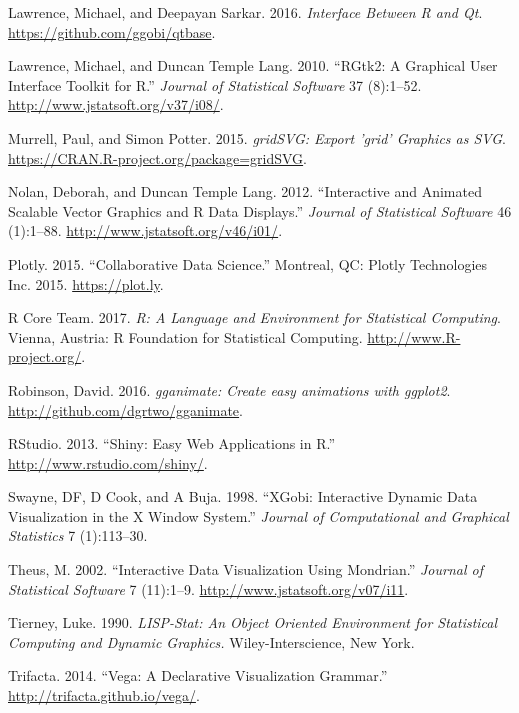 \documentclass[12pt,]{article}
\theoremstyle{definition}
\theoremstyle{definition}
\theoremstyle{definition}
\theoremstyle{remark}
\begin{document}
\leavevmode\hypertarget{ref-qtbase}{}%
Lawrence, Michael, and Deepayan Sarkar. 2016. \emph{Interface Between R
and Qt}. \url{https://github.com/ggobi/qtbase}.

\leavevmode\hypertarget{ref-RGtk2}{}%
Lawrence, Michael, and Duncan Temple Lang. 2010. ``RGtk2: A Graphical
User Interface Toolkit for R.'' \emph{Journal of Statistical Software}
37 (8):1--52. \url{http://www.jstatsoft.org/v37/i08/}.

\leavevmode\hypertarget{ref-gridSVG}{}%
Murrell, Paul, and Simon Potter. 2015. \emph{gridSVG: Export 'grid'
Graphics as SVG}. \url{https://CRAN.R-project.org/package=gridSVG}.

\leavevmode\hypertarget{ref-SVGAnnotation}{}%
Nolan, Deborah, and Duncan Temple Lang. 2012. ``Interactive and Animated
Scalable Vector Graphics and R Data Displays.'' \emph{Journal of
Statistical Software} 46 (1):1--88.
\url{http://www.jstatsoft.org/v46/i01/}.

\leavevmode\hypertarget{ref-plotly}{}%
Plotly. 2015. ``Collaborative Data Science.'' Montreal, QC: Plotly
Technologies Inc. 2015. \url{https://plot.ly}.

\leavevmode\hypertarget{ref-RCore}{}%
R Core Team. 2017. \emph{R: A Language and Environment for Statistical
Computing}. Vienna, Austria: R Foundation for Statistical Computing.
\url{http://www.R-project.org/}.

\leavevmode\hypertarget{ref-gganimate}{}%
Robinson, David. 2016. \emph{gganimate: Create easy animations with
ggplot2}. \url{http://github.com/dgrtwo/gganimate}.

\leavevmode\hypertarget{ref-shiny}{}%
RStudio. 2013. ``Shiny: Easy Web Applications in R.''
\url{http://www.rstudio.com/shiny/}.

\leavevmode\hypertarget{ref-xgobi}{}%
Swayne, DF, D Cook, and A Buja. 1998. ``XGobi: Interactive Dynamic Data
Visualization in the X Window System.'' \emph{Journal of Computational
and Graphical Statistics} 7 (1):113--30.

\leavevmode\hypertarget{ref-mondrian}{}%
Theus, M. 2002. ``Interactive Data Visualization Using Mondrian.''
\emph{Journal of Statistical Software} 7 (11):1--9.
\url{http://www.jstatsoft.org/v07/i11}.

\leavevmode\hypertarget{ref-LISP-STAT}{}%
Tierney, Luke. 1990. \emph{LISP-Stat: An Object Oriented Environment for
Statistical Computing and Dynamic Graphics.} Wiley-Interscience, New
York.

\leavevmode\hypertarget{ref-vega}{}%
Trifacta. 2014. ``Vega: A Declarative Visualization Grammar.''
\url{http://trifacta.github.io/vega/}.
\end{document}
